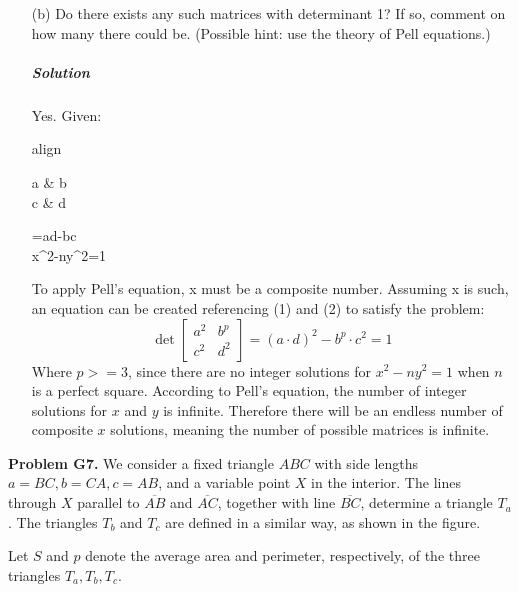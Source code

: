 \documentclass[a4paper]{amsart}
\begin{document}
\begin{flushleft}
\begin{enumerate}
			\item[(b)] Do there exists any such matrices with determinant 1? If so, comment on how many there could be. (Possible hint: use the theory of Pell equations.)
			
			\subparagraph{\textit{Solution}} Yes. Given:
			
			\begin{empheq}{align}
			 \det\begin{bmatrix} a & b \\ c & d \end{bmatrix}=a\cdot d-b\cdot c \\
			 x^2-ny^2=1
			\end{empheq}
			
			To apply Pell's equation, x must be a composite number. Assuming x is such, an equation can be created referencing (1) and (2) to satisfy the problem:
			\[ \det\begin{bmatrix} a^2 & b^p \\ c^2 & d^2 \end{bmatrix}=(a\cdot d)^2-b^p\cdot c^2=1 \]
			Where $p>=3$, since there are no integer solutions for $x^2-ny^2=1$ when $n$ is a perfect square. According to Pell's equation, the number of integer solutions for $x$ and $y$ is infinite. Therefore there will be an endless number of composite $x$ solutions, meaning the number of possible matrices is infinite.
		\end{enumerate}
	
		\textbf{Problem G7.} We consider a fixed triangle $ABC$ with side lengths $a=BC,b=CA,c=AB$, and a variable point $X$ in the interior. The lines through $X$ parallel to $\overline{AB}$ and $\overline{AC}$, together with line $\overline{BC}$, determine a triangle $T_a$. The triangles $T_b$ and $T_c$ are defined in a similar way, as shown in the figure. 
		\begin{center}
		\end{center}
		Let $S$ and $p$ denote the average area and perimeter, respectively, of the three triangles $T_a,T_b,T_c$.
		

\end{flushleft}
\end{document}
